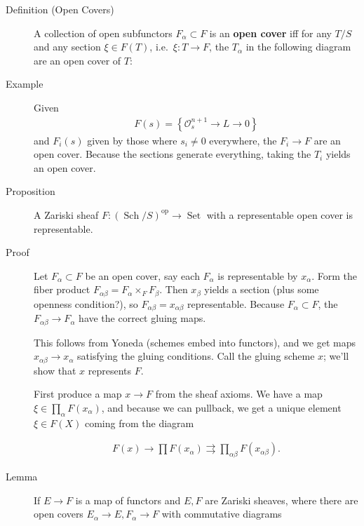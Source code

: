 \begin{description}
\item[Definition (Open Covers)]
A collection of open subfunctors \(F_\alpha \subset F\) is an
\textbf{open cover} iff for any \(T/S\) and any section
\(\xi \in F(T)\), i.e.~\(\xi: T\to F\), the \(T_\alpha\) in the
following diagram are an open cover of \(T\):

\begin{center}
\end{center}
\item[Example]
Given
\begin{align*}
F(s) = \left\{{{\mathcal{O}}_s^{n+1} \to L \to 0}\right\}
\end{align*}
and \(F_i(s)\) given by those where \(s_i \neq 0\) everywhere, the
\(F_i \to F\) are an open cover. Because the sections generate
everything, taking the \(T_i\) yields an open cover.
\item[Proposition]
A Zariski sheaf
\(F: ({\operatorname{Sch}}/S)^\operatorname{op}\to {\operatorname{Set}}\)
with a representable open cover is representable.
\item[Proof]
Let \(F_\alpha \subset F\) be an open cover, say each \(F_\alpha\) is
representable by \(x_\alpha\). Form the fiber product
\(F_{\alpha\beta} = F_\alpha \times_F F_\beta\). Then \(x_\beta\) yields
a section (plus some openness condition?), so
\(F_{\alpha\beta} = x_{\alpha\beta}\) representable. Because
\(F_\alpha \subset F\), the \(F_{\alpha\beta} \to F_\alpha\) have the
correct gluing maps.

\hfill\break

This follows from Yoneda (schemes embed into functors), and we get maps
\(x_{\alpha\beta} \to x_\alpha\) satisfying the gluing conditions. Call
the gluing scheme \(x\); we'll show that \(x\) represents \(F\).

First produce a map \(x\to F\) from the sheaf axioms. We have a map
\(\xi \in \prod_\alpha F(x_\alpha)\), and because we can pullback, we
get a unique element \(\xi \in F(X)\) coming from the diagram

\begin{align*} F(x) \to \prod F(x_\alpha) \rightrightarrows \prod_{\alpha\beta} F(x_{\alpha\beta}) .\end{align*}
\item[Lemma]
If \(E \to F\) is a map of functors and \(E, F\) are Zariski sheaves,
where there are open covers \(E_\alpha \to E, F_\alpha \to F\) with
commutative diagrams


\end{description}

